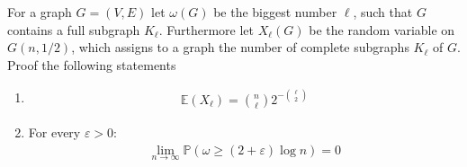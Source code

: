 \begin{problem}
  For a graph $G=(V,E)$ let $\omega(G)$ be the biggest number $\ell$, such that $G$ contains a full subgraph $K_{\ell}$. Furthermore let $X_{\ell}(G)$ be the random variable on $G(n, 1/2)$, which assigns to a graph the number of complete subgraphs $K_{\ell}$ of $G$. Proof the following statements
  \begin{enumerate}[label=(\roman*)]
    \item 
      \begin{align*}
        \mathbb{E}(X_{\ell}) = \binom{n}{\ell} 2^{-\binom{\ell}{2}}
      \end{align*}
    \item For every $\varepsilon > 0$: 
      \begin{align*}
        \lim\limits_{n \to \infty} \mathbb{P} (\omega \geq (2+\varepsilon) \log n) = 0
      \end{align*}
  \end{enumerate}
\end{problem}
